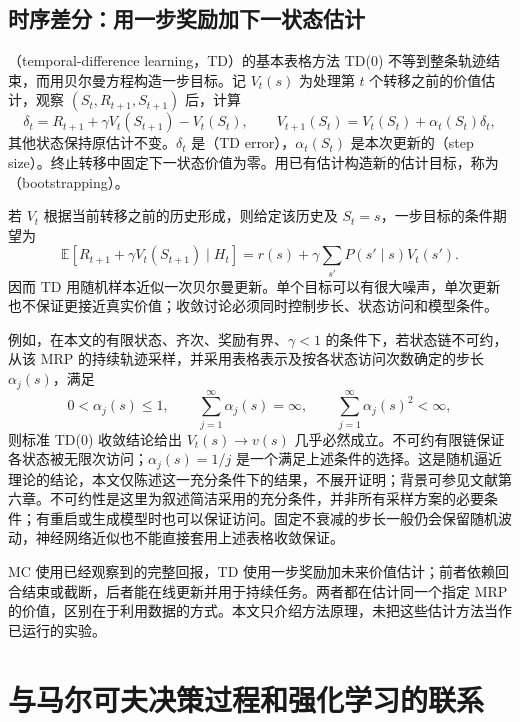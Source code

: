 \documentclass[UTF8]{ctexart}
\begin{document}
\subsection{时序差分：用一步奖励加下一状态估计}

（temporal-difference learning，TD）的基本表格方法 TD(0) 不等到整条轨迹结束，而用贝尔曼方程构造一步目标。记 $V_t(s)$ 为处理第 $t$ 个转移之前的价值估计，观察 $(S_t,R_{t+1},S_{t+1})$ 后，计算
\begin{equation}
  \delta_t=R_{t+1}+\gamma V_t(S_{t+1})-V_t(S_t),
  \qquad
  V_{t+1}(S_t)=V_t(S_t)+\alpha_t(S_t)\delta_t,
  \label{eq:mrp-td}
\end{equation}
其他状态保持原估计不变。$\delta_t$ 是（TD error），$\alpha_t(S_t)$ 是本次更新的（step size）。终止转移中固定下一状态价值为零。用已有估计构造新的估计目标，称为（bootstrapping）。

若 $V_t$ 根据当前转移之前的历史形成，则给定该历史及 $S_t=s$，一步目标的条件期望为
\[
  \mathbb E[R_{t+1}+\gamma V_t(S_{t+1})\mid H_t]
  =r(s)+\gamma\sum_{s'}P(s'\mid s)V_t(s').
\]
因而 TD 用随机样本近似一次贝尔曼更新。单个目标可以有很大噪声，单次更新也不保证更接近真实价值；收敛讨论必须同时控制步长、状态访问和模型条件。

例如，在本文的有限状态、齐次、奖励有界、$\gamma<1$ 的条件下，若状态链不可约，从该 MRP 的持续轨迹采样，并采用表格表示及按各状态访问次数确定的步长 $\alpha_j(s)$，满足
\begin{equation}
  0<\alpha_j(s)\leq1,\qquad
  \sum_{j=1}^{\infty}\alpha_j(s)=\infty,\qquad
  \sum_{j=1}^{\infty}\alpha_j(s)^2<\infty,
  \label{eq:mrp-td-stepsizes}
\end{equation}
则标准 TD(0) 收敛结论给出 $V_t(s)\to v(s)$ 几乎必然成立。不可约有限链保证各状态被无限次访问；$\alpha_j(s)=1/j$ 是一个满足上述条件的选择。这是随机逼近理论的结论，本文仅陈述这一充分条件下的结果，不展开证明；背景可参见文献\cite{sutton-barto-mrp}第六章。不可约性是这里为叙述简洁采用的充分条件，并非所有采样方案的必要条件；有重启或生成模型时也可以保证访问。固定不衰减的步长一般仍会保留随机波动，神经网络近似也不能直接套用上述表格收敛保证。

MC 使用已经观察到的完整回报，TD 使用一步奖励加未来价值估计；前者依赖回合结束或截断，后者能在线更新并用于持续任务。两者都在估计同一个指定 MRP 的价值，区别在于利用数据的方式。本文只介绍方法原理，未把这些估计方法当作已运行的实验。

\section{与马尔可夫决策过程和强化学习的联系}
\label{sec:mrp-mdp}
\end{document}
